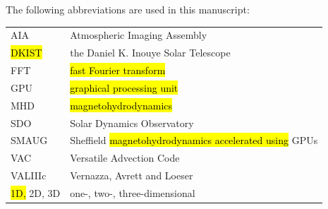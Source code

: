 \documentclass[physics,article,accept,pdftex,moreauthors]{Definitions/mdpi}
\begin{document}



\noindent
{} %

{} {The following abbreviations are used in this manuscript:\\

\noindent 
\begin{tabular}{@{}ll}
AIA & Atmospheric Imaging Assembly \\
\hl{DKIST} & the Daniel K. Inouye Solar Telescope\\
FFT & \hl{fast Fourier transform} \\
GPU & \hl{graphical processing unit} \\
MHD & \hl{magnetohydrodynamics} \\
SDO & Solar Dynamics Observatory \\
SMAUG & Sheffield \hl{magnetohydrodynamics accelerated using} GPUs \\
VAC & Versatile Advection Code \\
VALIIIc & Vernazza, Avrett and Loeser\\
\hl{1D,} 2D, 3D & one-, two-, three-dimensional

\end{tabular}
}
\end{document}
